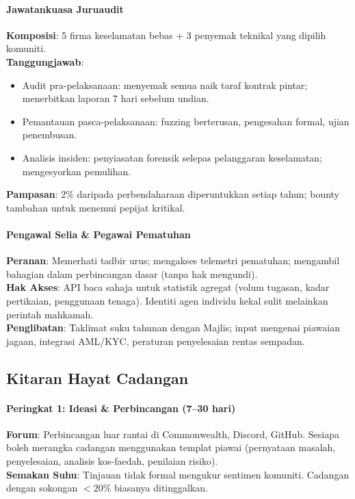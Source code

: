 \documentclass[11pt]{article}
\begin{document}
\paragraph{Jawatankuasa Juruaudit}
\textbf{Komposisi}: 5 firma keselamatan bebas + 3 penyemak teknikal yang dipilih komuniti.\\
\textbf{Tanggungjawab}:
\begin{itemize}[noitemsep]
  \item Audit pra-pelaksanaan: menyemak semua naik taraf kontrak pintar; menerbitkan laporan 7 hari sebelum undian.
  \item Pemantauan pasca-pelaksanaan: fuzzing berterusan, pengesahan formal, ujian penembusan.
  \item Analisis insiden: penyiasatan forensik selepas pelanggaran keselamatan; mengesyorkan pemulihan.
\end{itemize}
\textbf{Pampasan}: 2\% daripada perbendaharaan diperuntukkan setiap tahun; bounty tambahan untuk menemui pepijat kritikal.

\paragraph{Pengawal Selia \& Pegawai Pematuhan}
\textbf{Peranan}: Memerhati tadbir urus; mengakses telemetri pematuhan; mengambil bahagian dalam perbincangan dasar (tanpa hak mengundi).\\
\textbf{Hak Akses}: API baca sahaja untuk statistik agregat (volum tugasan, kadar pertikaian, penggunaan tenaga). Identiti agen individu kekal sulit melainkan perintah mahkamah.\\
\textbf{Penglibatan}: Taklimat suku tahunan dengan Majlis; input mengenai piawaian jagaan, integrasi AML/KYC, peraturan penyelesaian rentas sempadan.

\subsection{Kitaran Hayat Cadangan}

\paragraph{Peringkat 1: Ideasi \& Perbincangan (7--30 hari)}
\textbf{Forum}: Perbincangan luar rantai di Commonwealth, Discord, GitHub. Sesiapa boleh merangka cadangan menggunakan templat piawai (pernyataan masalah, penyelesaian, analisis kos-faedah, penilaian risiko).\\
\textbf{Semakan Suhu}: Tinjauan tidak formal mengukur sentimen komuniti. Cadangan dengan sokongan $<20\%$ biasanya ditinggalkan.
\end{document}
